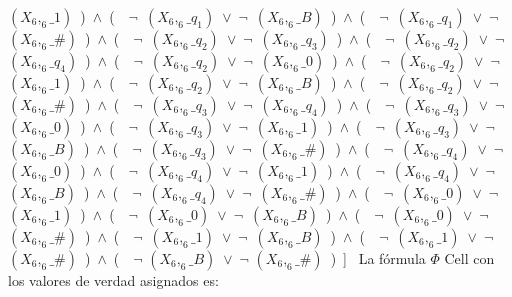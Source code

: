 ﻿\documentclass[a4paper,10pt]{article}
\begin{document}
$(X_6,_6\_1)$\ )\ $\wedge$\ (\ \ $\neg$\ $(X_6,_6\_q_1)$\ $\vee$\ $\neg$\ $(X_6,_6\_B)$\ )\ $\wedge$\ (\ \ $\neg$\ $(X_6,_6\_q_1)$\ $\vee$\ $\neg$\ $(X_6,_6\_\#)$\ )\ $\wedge$\ (\ \ $\neg$\ $(X_6,_6\_q_2)$\ $\vee$\ $\neg$\ $(X_6,_6\_q_3)$\ )\ $\wedge$\ (\ \ $\neg$\ $(X_6,_6\_q_2)$\ $\vee$\ $\neg$\ $(X_6,_6\_q_4)$\ )\ $\wedge$\ (\ \ $\neg$\ $(X_6,_6\_q_2)$\ $\vee$\ $\neg$\ $(X_6,_6\_0)$\ )\ $\wedge$\ (\ \ $\neg$\ $(X_6,_6\_q_2)$\ $\vee$\ $\neg$\ $(X_6,_6\_1)$\ )\ $\wedge$\ (\ \ $\neg$\ $(X_6,_6\_q_2)$\ $\vee$\ $\neg$\ $(X_6,_6\_B)$\ )\ $\wedge$\ (\ \ $\neg$\ $(X_6,_6\_q_2)$\ $\vee$\ $\neg$\ $(X_6,_6\_\#)$\ )\ $\wedge$\ (\ \ $\neg$\ $(X_6,_6\_q_3)$\ $\vee$\ $\neg$\ $(X_6,_6\_q_4)$\ )\ $\wedge$\ (\ \ $\neg$\ $(X_6,_6\_q_3)$\ $\vee$\ $\neg$\ $(X_6,_6\_0)$\ )\ $\wedge$\ (\ \ $\neg$\ $(X_6,_6\_q_3)$\ $\vee$\ $\neg$\ $(X_6,_6\_1)$\ )\ $\wedge$\ (\ \ $\neg$\ $(X_6,_6\_q_3)$\ $\vee$\ $\neg$\ $(X_6,_6\_B)$\ )\ $\wedge$\ (\ \ $\neg$\ $(X_6,_6\_q_3)$\ $\vee$\ $\neg$\ $(X_6,_6\_\#)$\ )\ $\wedge$\ (\ \ $\neg$\ $(X_6,_6\_q_4)$\ $\vee$\ $\neg$\ $(X_6,_6\_0)$\ )\ $\wedge$\ (\ \ $\neg$\ $(X_6,_6\_q_4)$\ $\vee$\ $\neg$\ $(X_6,_6\_1)$\ )\ $\wedge$\ (\ \ $\neg$\ $(X_6,_6\_q_4)$\ $\vee$\ $\neg$\ $(X_6,_6\_B)$\ )\ $\wedge$\ (\ \ $\neg$\ $(X_6,_6\_q_4)$\ $\vee$\ $\neg$\ $(X_6,_6\_\#)$\ )\ $\wedge$\ (\ \ $\neg$\ $(X_6,_6\_0)$\ $\vee$\ $\neg$\ $(X_6,_6\_1)$\ )\ $\wedge$\ (\ \ $\neg$\ $(X_6,_6\_0)$\ $\vee$\ $\neg$\ $(X_6,_6\_B)$\ )\ $\wedge$\ (\ \ $\neg$\ $(X_6,_6\_0)$\ $\vee$\ $\neg$\ $(X_6,_6\_\#)$\ )\ $\wedge$\ (\ \ $\neg$\ $(X_6,_6\_1)$\ $\vee$\ $\neg$\ $(X_6,_6\_B)$\ )\ $\wedge$\ (\ \ $\neg$\ $(X_6,_6\_1)$\ $\vee$\ $\neg$\ $(X_6,_6\_\#)$\ )\ $\wedge$\ (\ \ $\neg$ $(X_6,_6\_B)$\ $\vee$\ $\neg$ $(X_6,_6\_\#)$\ )\ ]\  \newline \newline 
La fórmula $\Phi$ Cell con los valores de verdad asignados es: \newline \newline 
\end{document}
